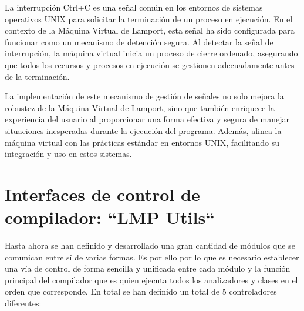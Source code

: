 La interrupción Ctrl+C es una señal común en los entornos de sistemas operativos UNIX para solicitar la terminación de un proceso en ejecución. En el contexto de la Máquina Virtual de Lamport, esta señal ha sido configurada para funcionar como un mecanismo de detención segura. Al detectar la señal de interrupción, la máquina virtual inicia un proceso de cierre ordenado, asegurando que todos los recursos y procesos en ejecución se gestionen adecuadamente antes de la terminación.

La implementación de este mecanismo de gestión de señales no solo mejora la robustez de la Máquina Virtual de Lamport, sino que también enriquece la experiencia del usuario al proporcionar una forma efectiva y segura de manejar situaciones inesperadas durante la ejecución del programa. Además, alinea la máquina virtual con las prácticas estándar en entornos UNIX, facilitando su integración y uso en estos sistemas.

\section{Interfaces de control de compilador: ``LMP Utils``}\label{sec:implementacionLMPUtils}
Hasta ahora se han definido y desarrollado una gran cantidad de módulos que se comunican entre sí de varias formas. Es por ello por lo que es necesario establecer una vía de control de forma sencilla y unificada entre cada módulo y la función principal del compilador que es quien ejecuta todos los analizadores y clases en el orden que corresponde. En total se han definido un total de 5 controladores diferentes:


